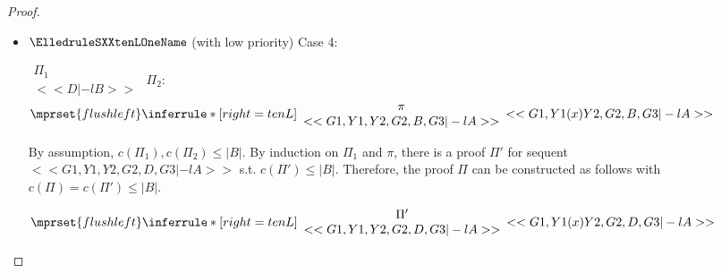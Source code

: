 \begin{proof}
\begin{enumerate}
\begin{itemize}
  \item $\ElledruleSXXtenLOneName$ (with low priority) Case 4:
      \begin{center}
        \scriptsize
        \begin{math}
          \begin{array}{c}
            \Pi_1 \\
            {<<D |-l B>>}
          \end{array}
        \end{math}
        \qquad\qquad
        $\Pi_2$:
        \begin{math}
          $$\mprset{flushleft}
          \inferrule* [right={\tiny tenL}] {
            {
              \begin{array}{c}
                \pi \\
                {<<G1, Y1, Y2, G2, B, G3 |-l A>>}
              \end{array}
            }
          }{<<G1, Y1 (x) Y2, G2, B, G3 |-l A>>}
        \end{math}
      \end{center}
      By assumption, $c(\Pi_1),c(\Pi_2)\leq |B|$. By induction on $\Pi_1$ and $\pi$, there is
      a proof $\Pi'$ for sequent $<<G1, Y1, Y2, G2, D, G3 |-l A>>$ s.t. $c(\Pi') \leq |B|$.
      Therefore, the proof $\Pi$ can be constructed as follows with
      $c(\Pi) = c(\Pi') \leq |B|$.
      \begin{center}
        \scriptsize
        \begin{math}
          $$\mprset{flushleft}
          \inferrule* [right={\tiny tenL}] {
            {
              \begin{array}{c}
                \Pi' \\
                {<<G1, Y1, Y2, G2, D, G3 |-l A>>}
              \end{array}
            }
          }{<<G1, Y1 (x) Y2, G2, D, G3 |-l A>>}
        \end{math}
      \end{center}


\end{itemize}
\end{enumerate}
\end{proof}
